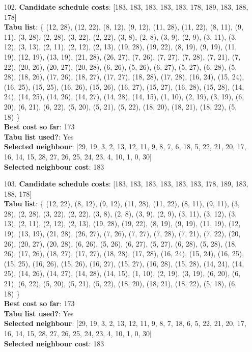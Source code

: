 \documentclass[fleqn]{article}
\begin{document}
\begin{itemize}
    \item[102.] \textbf{Candidate schedule costs}: [183, 183, 183, 183, 183, 178, 189, 183, 188, 178] \\
    \textbf{Tabu list}: \{ (12, 28), (12, 22), (8, 12), (9, 12), (11, 28), (11, 22), (8, 11), (9, 11), (3, 28), (2, 28), (3, 22), (2, 22), (3, 8), (2, 8), (3, 9), (2, 9), (3, 11), (3, 12), (3, 13), (2, 11), (2, 12), (2, 13), (19, 28), (19, 22), (8, 19), (9, 19), (11, 19), (12, 19), (13, 19), (21, 28), (26, 27), (7, 26), (7, 27), (7, 28), (7, 21), (7, 22), (20, 26), (20, 27), (20, 28), (6, 26), (5, 26), (6, 27), (5, 27), (6, 28), (5, 28), (18, 26), (17, 26), (18, 27), (17, 27), (18, 28), (17, 28), (16, 24), (15, 24), (16, 25), (15, 25), (16, 26), (15, 26), (16, 27), (15, 27), (16, 28), (15, 28), (14, 24), (14, 25), (14, 26), (14, 27), (14, 28), (14, 15), (1, 10), (2, 19), (3, 19), (6, 20), (6, 21), (6, 22), (5, 20), (5, 21), (5, 22), (18, 20), (18, 21), (18, 22), (5, 18) \} \\
    \textbf{Best cost so far}: 173 \\
    \textbf{Tabu list used?}: Yes \\
    \textbf{Selected neighbour}: [29, 19, 3, 2, 13, 12, 11, 9, 8, 7, 6, 18, 5, 22, 21, 20, 17, 16, 14, 15, 28, 27, 26, 25, 24, 23, 4, 10, 1, 0, 30] \\
    \textbf{Selected neighbour cost}: 183
      

    \item[103.] \textbf{Candidate schedule costs}: [183, 183, 183, 183, 183, 183, 178, 189, 183, 188, 178] \\
    \textbf{Tabu list}: \{ (12, 22), (8, 12), (9, 12), (11, 28), (11, 22), (8, 11), (9, 11), (3, 28), (2, 28), (3, 22), (2, 22), (3, 8), (2, 8), (3, 9), (2, 9), (3, 11), (3, 12), (3, 13), (2, 11), (2, 12), (2, 13), (19, 28), (19, 22), (8, 19), (9, 19), (11, 19), (12, 19), (13, 19), (21, 28), (26, 27), (7, 26), (7, 27), (7, 28), (7, 21), (7, 22), (20, 26), (20, 27), (20, 28), (6, 26), (5, 26), (6, 27), (5, 27), (6, 28), (5, 28), (18, 26), (17, 26), (18, 27), (17, 27), (18, 28), (17, 28), (16, 24), (15, 24), (16, 25), (15, 25), (16, 26), (15, 26), (16, 27), (15, 27), (16, 28), (15, 28), (14, 24), (14, 25), (14, 26), (14, 27), (14, 28), (14, 15), (1, 10), (2, 19), (3, 19), (6, 20), (6, 21), (6, 22), (5, 20), (5, 21), (5, 22), (18, 20), (18, 21), (18, 22), (5, 18), (6, 18) \} \\
    \textbf{Best cost so far}: 173 \\
    \textbf{Tabu list used?}: Yes \\
    \textbf{Selected neighbour}: [29, 19, 3, 2, 13, 12, 11, 9, 8, 7, 18, 6, 5, 22, 21, 20, 17, 16, 14, 15, 28, 27, 26, 25, 24, 23, 4, 10, 1, 0, 30] \\
    \textbf{Selected neighbour cost}: 183
      


\end{itemize}
\end{document}
